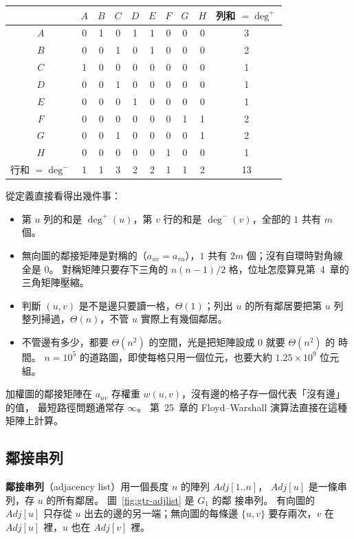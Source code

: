 \begin{center}
\begin{tabular}{c|cccccccc|c}
 & $A$ & $B$ & $C$ & $D$ & $E$ & $F$ & $G$ & $H$ & 列和 $= \deg^{+}$ \\
\hline
$A$ & 0 & 1 & 0 & 1 & 1 & 0 & 0 & 0 & 3 \\
$B$ & 0 & 0 & 1 & 0 & 1 & 0 & 0 & 0 & 2 \\
$C$ & 1 & 0 & 0 & 0 & 0 & 0 & 0 & 0 & 1 \\
$D$ & 0 & 0 & 1 & 0 & 0 & 0 & 0 & 0 & 1 \\
$E$ & 0 & 0 & 0 & 1 & 0 & 0 & 0 & 0 & 1 \\
$F$ & 0 & 0 & 0 & 0 & 0 & 0 & 1 & 1 & 2 \\
$G$ & 0 & 0 & 1 & 0 & 0 & 0 & 0 & 1 & 2 \\
$H$ & 0 & 0 & 0 & 0 & 0 & 1 & 0 & 0 & 1 \\
\hline
行和 $= \deg^{-}$ & 1 & 1 & 3 & 2 & 2 & 1 & 1 & 2 & 13 \\
\end{tabular}
\end{center}

從定義直接看得出幾件事：
\begin{itemize}
\item 第 $u$ 列的和是 $\deg^{+}(u)$，第 $v$ 行的和是 $\deg^{-}(v)$，全部的 $1$ 共有 $m$ 個。
\item 無向圖的鄰接矩陣是對稱的（$a_{uv} = a_{vu}$），$1$ 共有 $2m$ 個；沒有自環時對角線
全是 $0$。 對稱矩陣只要存下三角的 $n(n-1)/2$ 格，位址怎麼算見第~4~章的三角矩陣壓縮。
\item 判斷 $(u, v)$ 是不是邊只要讀一格，$\Theta(1)$；列出 $u$ 的所有鄰居要把第 $u$ 列
整列掃過，$\Theta(n)$，不管 $u$ 實際上有幾個鄰居。
\item 不管邊有多少，都要 $\Theta(n^2)$ 的空間，光是把矩陣設成 $0$ 就要 $\Theta(n^2)$ 的
時間。 $n = 10^5$ 的道路圖，即使每格只用一個位元，也要大約 $1.25 \times 10^9$ 位元
組。
\end{itemize}

加權圖的鄰接矩陣在 $a_{uv}$ 存權重 $w(u, v)$，沒有邊的格子存一個代表「沒有邊」的值，
最短路徑問題通常存 $\infty$。 第~25~章的 Floyd--Warshall 演算法直接在這種矩陣上計算。

\subsection{鄰接串列}

\textbf{鄰接串列}（adjacency list）用一個長度 $n$ 的陣列 $\mathit{Adj}[1..n]$，
$\mathit{Adj}[u]$ 是一條串列，存 $u$ 的所有鄰居。 圖~\ref{fig:gtr-adjlist} 是 $G_1$ 的鄰
接串列。 有向圖的 $\mathit{Adj}[u]$ 只存從 $u$ 出去的邊的另一端；無向圖的每條邊
$\{u, v\}$ 要存兩次，$v$ 在 $\mathit{Adj}[u]$ 裡，$u$ 也在 $\mathit{Adj}[v]$ 裡。


